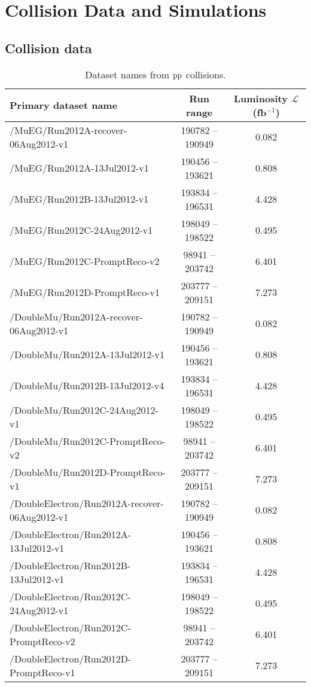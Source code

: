 \chapter{Collision Data and Simulations}


\section{Collision data}
\label{sec:CollsionData}


\begin{table*}[!hbtp]
\centering
\caption{Dataset names from $\mathrm{p} \mathrm{p}$ collisions.}
\label{tab:TableDataNames}
\begin{tabular}{l|c|c}
\hline \hline
Primary dataset name & Run range & Luminosity $\mathcal{L}$ (fb$^{-1}$) \\
\hline \hline
/MuEG/Run2012A-recover-06Aug2012-v1 & 190782 -- 190949 & 0.082 \\
/MuEG/Run2012A-13Jul2012-v1 & 190456 -- 193621 & 0.808 \\ %
/MuEG/Run2012B-13Jul2012-v1 & 193834 -- 196531 & 4.428 \\ %
/MuEG/Run2012C-24Aug2012-v1 & 198049 -- 198522 & 0.495 \\
/MuEG/Run2012C-PromptReco-v2 & 98941 -- 203742 & 6.401 \\ %
/MuEG/Run2012D-PromptReco-v1 & 203777 -- 209151 & 7.273 \\ %
\hline
/DoubleMu/Run2012A-recover-06Aug2012-v1 & 190782 -- 190949 & 0.082 \\
/DoubleMu/Run2012A-13Jul2012-v1 & 190456 -- 193621 & 0.808 \\ %
/DoubleMu/Run2012B-13Jul2012-v4 & 193834 -- 196531 & 4.428 \\ %
/DoubleMu/Run2012C-24Aug2012-v1 & 198049 -- 198522 & 0.495 \\
/DoubleMu/Run2012C-PromptReco-v2 & 98941 -- 203742 & 6.401 \\ %
/DoubleMu/Run2012D-PromptReco-v1 & 203777 -- 209151 & 7.273 \\ %
\hline
/DoubleElectron/Run2012A-recover-06Aug2012-v1 & 190782 -- 190949 & 0.082 \\
/DoubleElectron/Run2012A-13Jul2012-v1 & 190456 -- 193621 & 0.808 \\ %
/DoubleElectron/Run2012B-13Jul2012-v1 & 193834 -- 196531 & 4.428 \\ %
/DoubleElectron/Run2012C-24Aug2012-v1 & 198049 -- 198522 & 0.495 \\
/DoubleElectron/Run2012C-PromptReco-v2 & 98941 -- 203742 & 6.401 \\ %
/DoubleElectron/Run2012D-PromptReco-v1 & 203777 -- 209151 & 7.273 \\ %
\hline \hline
\end{tabular}
\end{table*}



